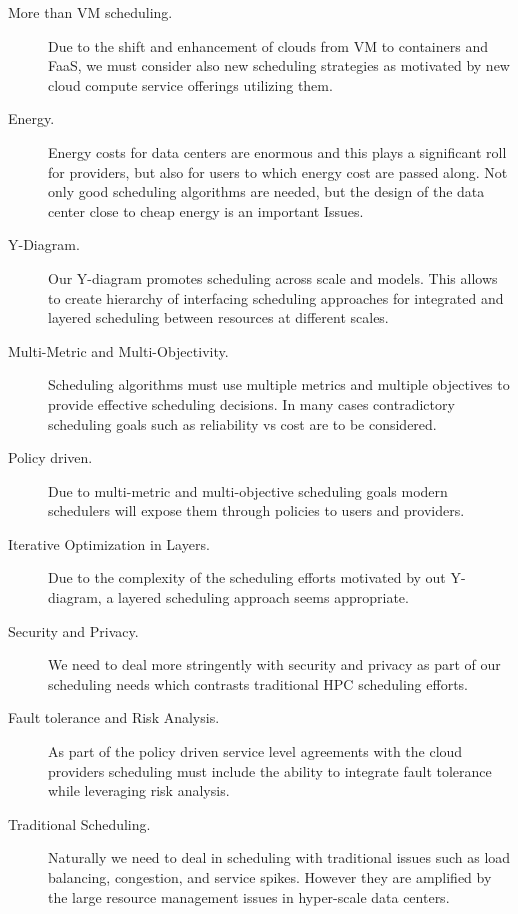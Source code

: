 \documentclass[final,5p,times,twocolumn]{elsarticle}
\begin{document}
\begin{description}

\item[More than VM scheduling.] Due to the shift and enhancement of
clouds from VM to containers and FaaS, we must consider also new
scheduling strategies as motivated by new cloud compute service
offerings utilizing them.

\item[Energy.] Energy costs for data centers are enormous and this
plays a significant roll for providers, but also for users to which
energy cost are passed along. Not only good scheduling algorithms are
needed, but the design of the data center close to cheap energy is an
important Issues.

\item[Y-Diagram.] Our Y-diagram promotes scheduling across scale and
models. This allows to create hierarchy of interfacing scheduling
approaches for integrated and layered scheduling between resources at
different scales.

\item[Multi-Metric and Multi-Objectivity.] Scheduling algorithms must
use multiple metrics and multiple objectives to provide effective
scheduling decisions. In many cases contradictory scheduling goals
such as reliability vs cost are to be considered.

\item[Policy driven.] Due to multi-metric and multi-objective
scheduling goals modern schedulers will expose them through policies
to users and providers.


\item[Iterative Optimization in Layers.] Due to the complexity of the
scheduling efforts motivated by out Y-diagram, a layered scheduling
approach seems appropriate.


\item[Security and Privacy.]  We need to deal more stringently with
security and privacy as part of our scheduling needs which contrasts
traditional HPC scheduling efforts.

\item[Fault tolerance and Risk Analysis.] As part of the policy driven
service level agreements with the cloud providers scheduling must
include the ability to integrate fault tolerance while leveraging risk
analysis.

\item[Traditional Scheduling.] Naturally we need to deal in scheduling
with traditional issues such as load balancing, congestion, and
service spikes. However they are amplified by the large resource
management issues in hyper-scale data centers.



\end{description}
\end{document}
